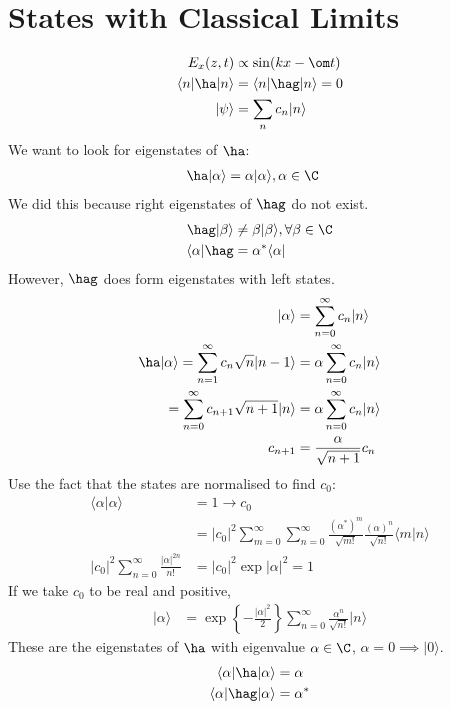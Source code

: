 \documentclass[a4paper, 11pt, normalem]{report}
\begin{document}
\section{States with Classical Limits}
\begin{align}
    E_x(z,t) &\propto \sin(kx-\om t) \\
    \langle n|\ha|n\rangle &= \langle n|\hag|n\rangle = 0 \\
    |\psi\rangle &= \sum_n c_n |n\rangle
\end{align}
We want to look for eigenstates of $\ha$:
\begin{align}
    \ha|\alpha\rangle &= \alpha|\alpha\rangle, \alpha\in\C
\end{align}
We did this because right eigenstates of $\hag$ do not exist.
\begin{align}
    \hag|\beta\rangle &\neq \beta|\beta\rangle,\forall \beta \in \C \\
    \langle\alpha|\hag &= \alpha^*\langle\alpha|
\end{align}
However, $\hag$ does form eigenstates with left states. 
\begin{align}
    |\alpha\rangle &= \sum_{n=0}^\infty c_n|n\rangle \\
    \ha|\alpha\rangle = \sum_{n=1}^\infty c_n\sqrt{n}|n-1\rangle &= \alpha\sum_{n=0}^\infty c_n|n\rangle \\
    = \sum_{n=0}^\infty c_{n+1}\sqrt{n+1}|n\rangle &= \alpha\sum_{n=0}^\infty c_n|n\rangle \\
    c_{n+1} &= \frac{\alpha}{\sqrt{n+1}}c_n
\end{align}
Use the fact that the states are normalised to find $c_0$:
\begin{align}
    \langle\alpha|\alpha\rangle &= 1 \to c_0 \\
                                &= |c_0|^2\sum_{m=0}^\infty \sum_{n=0}^\infty \frac{(\alpha^*)^m}{\sqrt{m!}}\frac{(\alpha)^n}{\sqrt{n!}}\langle m|n\rangle \\
    |c_0|^2\sum_{n=0}^\infty \frac{|\alpha|^{2n}}{n!} &= |c_0|^2\exp|\alpha|^2 = 1
\end{align}
If we take $c_0$ to be real and positive,
\begin{align}
    |\alpha\rangle &= \exp\left\{-\frac{|\alpha|^2}{2}\right\} \sum_{n=0}^\infty \frac{\alpha^n}{\sqrt{n!}}|n\rangle
\end{align}
These are the eigenstates of $\ha$ with eigenvalue $\alpha \in \C$, $\alpha=0 \implies |0\rangle$.
\begin{align}
    \langle\alpha|\ha|\alpha\rangle &= \alpha \\
    \langle\alpha|\hag|\alpha\rangle &= \alpha^*
\end{align}
\end{document}
